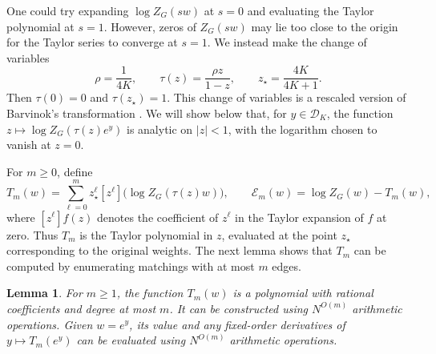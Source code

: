 \documentclass[11pt,reqno,letterpaper]{amsart}
\numberwithin{equation}{section}
\newtheorem{lemma}[lemma]{Lemma}
\theoremstyle{definition}
\theoremstyle{remark}
\newcommand{\cD}{\mathcal D}
\begin{document}
One could try expanding $\log Z_G(sw)$ at $s=0$ and evaluating the
Taylor polynomial at $s=1$. However, zeros of $Z_G(sw)$ may lie too
close to the origin for the Taylor series to converge at $s=1$.
We instead make the change of variables
\begin{equation}\label{eq:interpolation-map}
 \rho=\frac1{4K},\qquad
 \tau(z)=\frac{\rho z}{1-z},\qquad
 z_\star=\frac{4K}{4K+1}.
\end{equation}
Then $\tau(0)=0$ and $\tau(z_\star)=1$. This change of variables
is a rescaled version of Barvinok's transformation
\cite[Lemma~2.4]{BarvinokReal}. We will show below that, for
$y\in\cD_K$, the function $z\mapsto\log Z_G(\tau(z)e^y)$
is analytic on $|z|<1$, with the logarithm chosen to vanish
at $z=0$.

For $m\ge0$, define
\begin{equation*}
 T_m(w)=\sum_{\ell=0}^m z_\star^\ell
       [z^\ell]\bigl(\log Z_G(\tau(z)w)\bigr),
 \qquad
 \mathcal E_m(w)=\log Z_G(w)-T_m(w),
\end{equation*}
where $[z^\ell]f(z)$ denotes the coefficient of $z^\ell$ in the
Taylor expansion of $f$ at zero. Thus $T_m$ is the Taylor polynomial in $z$,
evaluated at the point $z_\star$ corresponding to the original weights.
The next lemma shows that $T_m$ can be computed by enumerating
matchings with at most $m$ edges.

\begin{lemma}\label{lem:taylor-construction}
For $m\ge1$, the function $T_m(w)$ is a polynomial with rational
coefficients and degree at most $m$. It can be constructed using
$N^{O(m)}$ arithmetic operations. Given $w=e^y$, its value and any
fixed-order derivatives of $y\mapsto T_m(e^y)$ can be evaluated using $N^{O(m)}$ arithmetic operations.
\end{lemma}
\end{document}
